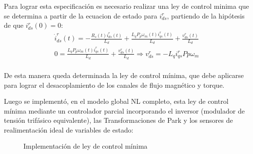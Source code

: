 \documentclass[a4paper, 10pt, onecolumn,journal]{ieeeconf}
\begin{document}
Para lograr esta especificación es necesario realizar una ley de control minima que se determina a partir de la ecuacion de estado para $i^{r}_{ds}$, partiendo de la hipótesis de que $i^{r}_{ds}(0)=0$:
\begin{equation}
	\begin{aligned}
		\dot{i}^r_{ds}(t) = -\frac{R_s(t) i^r_{ds}(t)}{L_d} + \frac{L_q P_p \omega_m(t)i^r_{qs}(t)}{L_d}  + \frac{v^r_{ds}(t)}{L_d}\\
		0= \frac{L_q P_p \omega_m(t)i^r_{qs}(t)}{L_d}  + \frac{v^r_{ds}(t)}{L_d}\Rightarrow	v^{r}_{ds}= -L_{q}i^{r}_{qs}Pp\omega_{m}\\
		\label{ecuacion determinacion ley de control minima}
	\end{aligned}	
\end{equation}

De esta manera queda determinada la ley de control mínima, que debe aplicarse para lograr el desacoplamiento de los canales de flujo magnético y torque.

Luego se implementó, en el modelo global NL completo, esta  ley de control mínima mediante un controlador parcial incorporando el inversor (modulador de tensión trifásico equivalente), las Transformaciones de Park y los sensores de realimentación ideal de variables de estado:

\begin{figure}[thpb]
	\centering
	\begin{adjustbox}{max width=\columnwidth}
	\end{adjustbox}
	\caption{Implementación de ley de control mínima}
	\label{Implementación de ley de control mínima}
\end{figure}
\end{document}
